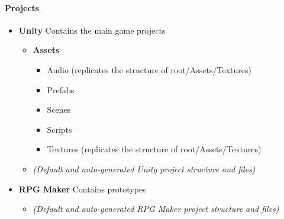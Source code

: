 \paragraph{Projects}

\begin{itemize}[noitemsep, nolistsep, label={-}]
	\item \textbf{Unity} Contains the main game projects
		\begin{itemize}[noitemsep, nolistsep, label={-}]
			\item \textbf{Assets}
				\begin{itemize}[noitemsep, nolistsep, label={-}]
					\item Audio (replicates the structure of root/Assets/Textures)
					\item Prefabs
					\item Scenes
					\item Scripts
					\item Textures (replicates the structure of root/Assets/Textures)
				\end{itemize}
			\item \textit{(Default and auto-generated Unity project structure and files)}
		\end{itemize}
	
	\item \textbf{RPG Maker} Contains prototypes
		\begin{itemize}[noitemsep, nolistsep, label={-}]
			\item \textit{(Default and auto-generated RPG Maker project structure and files)}
		\end{itemize}
\end{itemize}
	
\pagebreak
